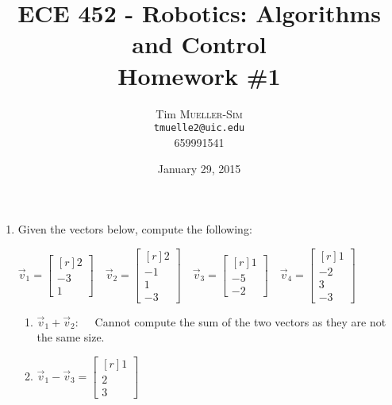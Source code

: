 \documentclass[11pt, oneside, letter]{article}
\begin{document}
\title{{\sc ECE 452} - {\sc Robotics: Algorithms and Control} \\ {\large \sc Homework \#1}}
\author{Tim \textsc{Mueller-Sim} \\ {\tt tmuelle2@uic.edu} \\ \textsc{659991541} }
\date{January 29, 2015}

\maketitle 

\vspace{-5ex}
\noindent \hrulefill

	\begin{enumerate}

	\item Given the vectors below, compute the following:
	\begin{center}
	$
	\vec{v}_1 = 
	\begin{bmatrix*}[r]
	2 \\ -3 \\ 1
	\end{bmatrix*}
	\quad
	\vec{v}_2 = 
	\begin{bmatrix*}[r]
	2 \\ -1 \\ 1 \\ -3
	\end{bmatrix*}
	\quad
	\vec{v}_3 = 
	\begin{bmatrix*}[r]
	1 \\ -5 \\ -2
	\end{bmatrix*}
	\quad
	\vec{v}_4 = 
	\begin{bmatrix*}[r]
	1 \\ -2 \\ 3 \\ -3
	\end{bmatrix*}
	$
	\end{center}

		\begin{enumerate}
		\item $\vec{v}_1 + \vec{v}_2: \quad$
		Cannot compute the sum of the two vectors as they are not the same size.
	
		\item $\vec{v}_1 - \vec{v}_3 = \begin{bmatrix*}[r]
		1 \\ 2 \\ 3
		\end{bmatrix*}$
	

\end{enumerate}
\end{enumerate}
\end{document}
